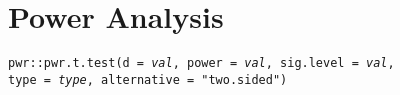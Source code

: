 \documentclass{tufte-handout}
\begin{document}
\vspace{5mm}
\section{Power Analysis}
\noindent \texttt{pwr::}{\color{red}\texttt{pwr.t.test}}\texttt{(d = \textit{val}, power = \textit{val}, sig.level = \textit{val}, \\type = \textit{type}, alternative = "two.sided")}\\


\end{document}
